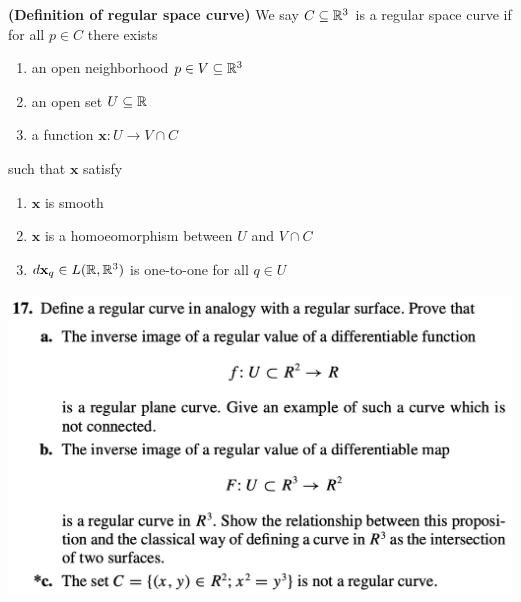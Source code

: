 \documentclass{report}
\begin{document}
\begin{definition}
\textbf{(Definition of regular space curve)} We say $C\subseteq \mathbb{R}^3$ is a regular space curve if for all $p\in  C$ there exists 
\begin{enumerate}[label=(\alph*)]
  \item an open neighborhood $p \in V \subseteq \mathbb{R}^3$ 
  \item an open set $U\subseteq \mathbb{R}$
  \item a function $\textbf{x}:U \rightarrow V\cap C $
\end{enumerate}
such that $\textbf{x}$ satisfy
\begin{enumerate}[label=(\alph*)]
  \item $\textbf{x}$ is smooth 
  \item $\textbf{x}$ is a homoeomorphism between $U$ and  $V\cap C$
  \item $d\textbf{x}_q\in L(\mathbb{R},\mathbb{R}^3)$ is one-to-one for all $q \in U$
\end{enumerate}
\end{definition}
\begin{question}{}{}
\includegraphics[height=8cm,width=18cm]{HW317}
\end{question}
\end{document}
